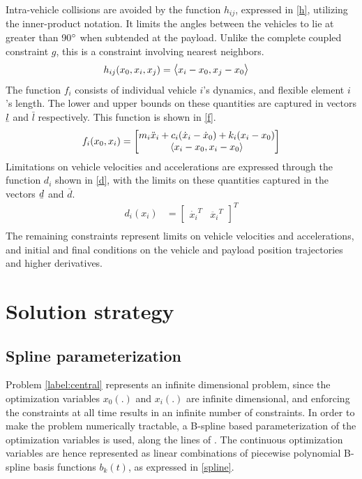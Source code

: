 \documentclass[letterpaper, 10 pt, conference]{ieeeconf}
\newcommand{\ubar}[1]{\text{\b{$#1$}}}
\begin{document}
\noindent
Intra-vehicle collisions are avoided by the function $h_{ij}$, expressed in \eqref{h}, utilizing the inner-product notation. It limits the angles between the vehicles to lie at greater than 90$\degree$ when subtended at the payload. Unlike the complete coupled constraint $g$, this is a constraint involving nearest neighbors.
 \begin{equation}\label{h}
\begin{aligned}
h_{ij}(x_0,x_i,x_j) &= \mathlarger{\langle} x_i - x_0,x_j - x_0 \mathlarger{\rangle}
\end{aligned}
\end{equation}
The function $f_i$ consists of individual vehicle $i$'s dynamics, and flexible element $i$'s length. The lower and upper bounds on these quantities are captured in vectors $\ubar{l}$ and $\bar{l}$ respectively. This function is shown in \eqref{f}.
 \begin{equation}\label{f}
 \begin{aligned}
 f_i(x_0,x_i) &=
 \begin{bmatrix}
   m_i\ddot{x}_i + c_i(\dot{x}_i-\dot{x}_0) + k_i(x_i-x_0) \\
  \mathlarger{\langle} x_i - x_0,x_i - x_0 \mathlarger{\rangle}
 \end{bmatrix} \\
 \end{aligned}
 \end{equation}
 Limitations on vehicle velocities and accelerations are expressed through the function $d_i$ shown in \eqref{d}, with the limits on these quantities captured in the vectors $\ubar{d}$ and $\bar{d}$.
 \begin{equation}\label{d}
 \begin{aligned}
 d_i(x_i) &=
 \begin{bmatrix}
  \dot{x_i}^T & \ddot{x_i}^T
 \end{bmatrix}^T \\
 \end{aligned}
 \end{equation}
 The remaining constraints represent limits on vehicle velocities and accelerations, and initial and final conditions on the vehicle and payload position trajectories and higher derivatives.
\section{Solution strategy}
\subsection{Spline parameterization}
Problem \eqref{label:central} represents an infinite dimensional problem, since the optimization variables $x_0(.)$ and $x_i(.)$ are infinite dimensional, and enforcing the constraints at all time results in an infinite number of constraints. In order to make the problem numerically tractable, a B-spline based parameterization of the optimization variables is used, along the lines of \cite{c15}. The continuous optimization variables are hence represented as linear combinations of piecewise polynomial B-spline basis functions $b_k(t)$, as expressed in \eqref{spline}.
\end{document}
